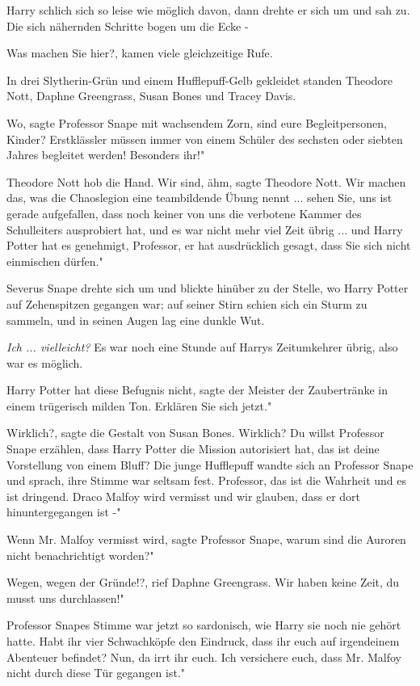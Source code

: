 Harry schlich sich so leise wie möglich davon, dann drehte er sich um und sah
zu. Die sich nähernden Schritte bogen um die Ecke -

\glqq Was machen Sie hier?\grqq{}, kamen viele gleichzeitige Rufe.

In drei Slytherin-Grün und einem Hufflepuff-Gelb gekleidet standen Theodore
Nott, Daphne Greengrass, Susan Bones und Tracey Davis.

\glqq Wo\grqq{}, sagte Professor Snape mit wachsendem Zorn, \glqq sind eure
Begleitpersonen, Kinder? Erstklässler müssen immer von einem Schüler des
sechsten oder siebten Jahres begleitet werden! Besonders ihr!"

Theodore Nott hob die Hand. \glqq Wir sind, ähm\grqq{}, sagte Theodore Nott.
\glqq Wir machen das, was die Chaoslegion eine teambildende Übung nennt ...
sehen Sie, uns ist gerade aufgefallen, dass noch keiner von uns die verbotene
Kammer des Schulleiters ausprobiert hat, und es war nicht mehr viel Zeit übrig
... und Harry Potter hat es genehmigt, Professor, er hat ausdrücklich gesagt,
dass Sie sich nicht einmischen dürfen."

Severus Snape drehte sich um und blickte hinüber zu der Stelle, wo Harry Potter
auf Zehenspitzen gegangen war; auf seiner Stirn schien sich ein Sturm zu
sammeln, und in seinen Augen lag eine dunkle Wut.

\emph{Ich ... vielleicht?}
Es war noch eine Stunde auf Harrys Zeitumkehrer übrig, also war es möglich.

\glqq Harry Potter hat diese Befugnis nicht\grqq{}, sagte der Meister der
Zaubertränke in einem trügerisch milden Ton. \glqq Erklären Sie sich jetzt."

\glqq Wirklich?\grqq{}, sagte die Gestalt von Susan Bones. \glqq Wirklich? Du
willst Professor Snape erzählen, dass Harry Potter die Mission autorisiert hat,
das ist deine Vorstellung von einem Bluff?\grqq{} Die junge Hufflepuff wandte
sich an Professor Snape und sprach, ihre Stimme war seltsam fest. \glqq
Professor, das ist die Wahrheit und es ist dringend. Draco Malfoy wird vermisst
und wir glauben, dass er dort hinuntergegangen ist -"

\glqq Wenn Mr. Malfoy vermisst wird\grqq{}, sagte Professor Snape, \glqq warum
sind die Auroren nicht benachrichtigt worden?"

\glqq Wegen, wegen der Gründe!?\grqq{}, rief Daphne Greengrass. \glqq Wir haben
keine Zeit, du musst uns durchlassen!"

Professor Snapes Stimme war jetzt so sardonisch, wie Harry sie noch nie gehört
hatte. \glqq Habt ihr vier Schwachköpfe den Eindruck, dass ihr euch auf
irgendeinem Abenteuer befindet? Nun, da irrt ihr euch. Ich versichere euch, dass
Mr. Malfoy nicht durch diese Tür gegangen ist."

